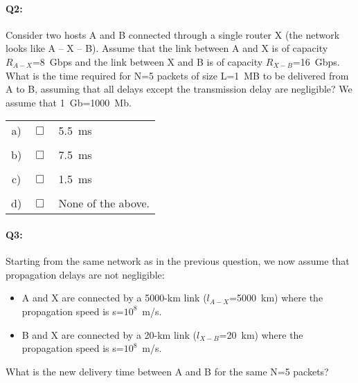 \documentclass{llncs}
\newcommand{\answer}[1]{}%
\begin{document}
\answer{The application and transport layers are both implemented only at
  the network edge. It means that they are only implemented in end
  systems but not in routers. See slide 62 in Chapter 1.}

\paragraph{\textbf{Q2:}} Consider two hosts A and B connected through a single router X (the
  network looks like A -- X -- B). Assume that the link between A and
  X is of capacity $R_{A-X}$=8~Gbps and the link between X and B is of
  capacity $R_{X-B}$=16~Gbps. What is the time required for N=5
  packets of size L=1~MB to be delivered from A to B, assuming that all
  delays except the transmission delay are negligible? We assume that 1~Gb=1000~Mb.\\
  
\begin{tabular}{ccl}
  a) & $\Box$ & 5.5~ms\\
  \\
  b) & $\Box$ & 7.5~ms\\
  \\
  c) & $\Box$ & 1.5~ms\\
  \\
  d) & $\Box$ & None of the above.
\end{tabular}

\answer{ The delivery time is the sum of (1) the transmission delay
  \underline{of the last packet} from A to X and (2) the transmission delay
  \underline{of the last packet} from X to B.
\begin{itemize}
 \item Transmission delay from A to X: $t_{A-X}=N\frac{L}{R_{A-X}}$ (N-1 packets have to be transmitted before the last packet can be transmitted).
 \item Transmission delay from X to B: $t_{X-B}=\frac{L}{R_{X-B}}$ (when the last packet arrives in X, the first N-1 have already been transmitted since $R_{X-B}>R_{A-X}$).
 \item See slides 45-47 in Chapter 1.
\end{itemize}
}

\paragraph{\textbf{Q3:}} Starting from the same network as in the previous question, we now assume that propagation delays are not negligible:
\begin{itemize}
\item A and X are connected by a 5000-km link ($l_{A-X}$=5000~km) where the propagation speed is s=$10^8$~m/s.
\item B and X are connected by a 20-km link ($l_{X-B}$=20~km) where the propagation speed is s=$10^8$~m/s.
\end{itemize}
What is the new delivery time between A and B for the same N=5 packets?\\
\end{document}
